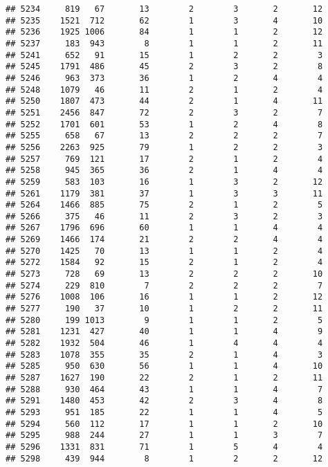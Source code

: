\documentclass[]{article}
\begin{document}
\begin{verbatim}
## 5234     819   67       13        2        3       2       12
## 5235    1521  712       62        1        3       4       10
## 5236    1925 1006       84        1        1       2       12
## 5237     183  943        8        1        1       2       11
## 5241     652   91       15        1        2       2        3
## 5245    1791  486       45        2        3       2        8
## 5246     963  373       36        1        2       4        4
## 5248    1079   46       11        2        1       2        4
## 5250    1807  473       44        2        1       4       11
## 5251    2456  847       72        2        3       2        7
## 5252    1701  601       53        1        2       4        8
## 5255     658   67       13        2        2       2        7
## 5256    2263  925       79        1        2       2        3
## 5257     769  121       17        2        1       2        4
## 5258     945  365       36        2        1       4        4
## 5259     583  103       16        1        3       2       12
## 5261    1179  381       37        1        3       3       11
## 5264    1466  885       75        2        1       2        5
## 5266     375   46       11        2        3       2        3
## 5267    1796  696       60        1        1       4        4
## 5269    1466  174       21        2        2       4        4
## 5270    1425   70       13        1        1       2        4
## 5272    1584   92       15        2        1       2        4
## 5273     728   69       13        2        2       2       10
## 5274     229  810        7        2        2       2        7
## 5276    1008  106       16        1        1       2       12
## 5277     190   37       10        1        2       2       11
## 5280     199 1013        9        1        1       2        5
## 5281    1231  427       40        1        1       4        9
## 5282    1932  504       46        1        4       4        4
## 5283    1078  355       35        2        1       4        3
## 5285     950  630       56        1        1       4       10
## 5287    1627  190       22        2        1       2       11
## 5288     930  464       43        1        1       4        7
## 5291    1480  453       42        2        3       4        8
## 5293     951  185       22        1        1       4        5
## 5294     560  112       17        1        1       2       10
## 5295     988  244       27        1        1       3        7
## 5296    1331  831       71        1        5       4        4
## 5298     439  944        8        1        2       2       12

\end{verbatim}
\end{document}
